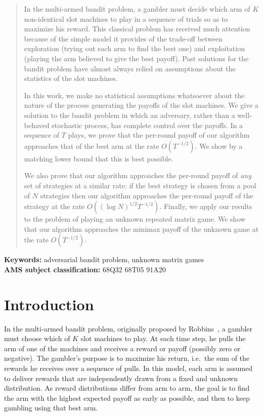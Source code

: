 \documentclass[12pt]{article}
\begin{document}
\vspace{-1ex}
\begin{abstract}
In the multi-armed bandit problem, a gambler must decide which arm
of $K$ non-identical slot machines to play in a sequence of trials
so as to maximize his reward.  This classical problem has received
much attention because of the simple model it provides of the
trade-off between exploration (trying out each arm to find the best
one) and exploitation (playing the arm believed to give the best
payoff).  Past solutions for the bandit problem have almost always
relied on assumptions about the statistics of the slot machines.

In this work, we make no statistical assumptions whatsoever about
the nature of the process generating the payoffs of the slot
machines.  We give a solution to the bandit problem in which an
adversary, rather than a well-behaved stochastic process, has
complete control over the payoffs.  In a sequence of $T$ plays, we
prove that the per-round payoff of our algorithm approaches that of
the best arm at the rate $O\left(T^{-1/2}\right)$. We show by a
matching lower bound that this is best possible.

We also prove that our algorithm approaches the per-round payoff of
{\em any} set of strategies at a similar rate: if the best strategy
is chosen from a pool of $N$ strategies then our algorithm
approaches the per-round payoff of the strategy at the rate
$O\left((\log N)^{1/2} T^{-1/2}\right)$.
%
Finally, we apply our results to the problem of playing an unknown
repeated matrix game. We show that our algorithm approaches the
minimax payoff of the unknown game at the rate
$O\left(T^{-1/2}\right)$.
\end{abstract}
{\bf Keywords:} adversarial bandit problem, unknown matrix games\\ 
{\bf AMS subject classification:} 68Q32 68T05 91A20\\

\section{Introduction}
\label{s:intro}
In the multi-armed bandit problem, originally proposed by Robbins~\cite{Robbins52},
a gambler must choose which of $K$ slot machines to play. At each time step, he pulls
the arm of one of the machines and receives a reward or payoff (possibly zero
or negative). The gambler's purpose is to maximize his return, i.e.\ the sum of the
rewards he receives over a sequence of pulls.  In this model, each arm is assumed
to deliver rewards that are independently drawn from a fixed and unknown distribution.
As reward distributions differ from arm to arm, the goal is to find the arm with the
highest expected payoff as early as possible, and then to keep gambling using that
best arm.
\end{document}
